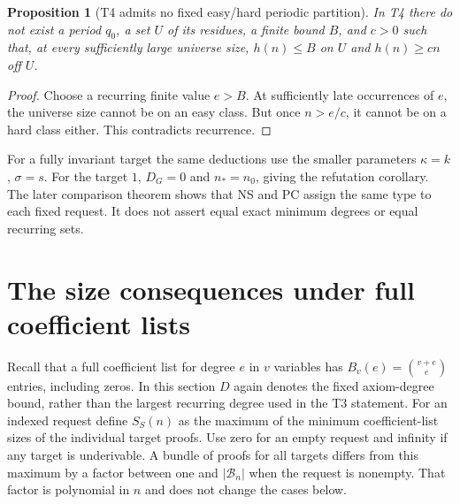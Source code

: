 \documentclass[11pt,a4paper,oneside,openany]{book}
\newtheorem{proposition}[theorem]{Proposition}
\theoremstyle{definition}\newtheorem{definition}[theorem]{Definition}
\theoremstyle{remark}\newtheorem{remark}[theorem]{Remark}
\numberwithin{equation}{chapter}
\begin{document}
\begin{proposition}[T4 admits no fixed easy/hard periodic partition]\label{tx:prop:no-periodic-split}
In T4 there do not exist a period $q_0$, a set $U$ of its residues, a
finite bound $B$, and $c>0$ such that, at every sufficiently large universe size,
$h(n)\le B$ on $U$ and $h(n)\ge cn$ off $U$.
\end{proposition}
\begin{proof}
Choose a recurring finite value $e>B$. At sufficiently late occurrences
of $e$, the universe size cannot be on an easy class. But once $n>e/c$, it cannot
be on a hard class either. This contradicts recurrence.
\end{proof}

For a fully invariant target the same deductions use the smaller
parameters $\kappa=k$, $\sigma=s$. For the target $1$, $D_G=0$ and
$n_*=n_0$, giving the refutation corollary. The later comparison theorem
shows that NS and PC assign the same type to each fixed request. It
does not assert equal exact minimum degrees or equal recurring sets.

\section{The size consequences under full coefficient lists}
Recall that a full coefficient list for degree $e$ in $v$ variables
has $B_v(e)=\binom{v+e}{e}$ entries, including zeros. In this section
$D$ again denotes the fixed axiom-degree bound, rather than the largest
recurring degree used in the T3 statement.
For an indexed request define $S_S(n)$ as the maximum of the minimum
coefficient-list sizes of the individual target proofs. Use zero for
an empty request and infinity if any target is underivable. A bundle
of proofs for all targets differs from this maximum by a factor between
one and $|\mathcal B_n|$ when the request is nonempty. That factor is
polynomial in $n$ and does not change the cases below.
\end{document}

